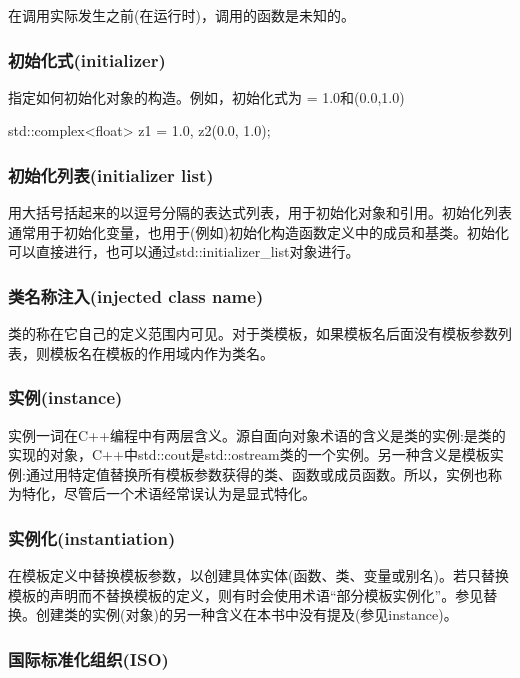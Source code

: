 在调用实际发生之前(在运行时)，调用的函数是未知的。

\subsubsection{初始化式(initializer)}

指定如何初始化对象的构造。例如，初始化式为 = 1.0和(0.0,1.0)
\begin{cpp}
std::complex<float> z1 = 1.0, z2(0.0, 1.0);
\end{cpp}

\subsubsection{初始化列表(initializer list)}

用大括号括起来的以逗号分隔的表达式列表，用于初始化对象和引用。初始化列表通常用于初始化变量，也用于(例如)初始化构造函数定义中的成员和基类。初始化可以直接进行，也可以通过std::initializer\_list对象进行。

\subsubsection{类名称注入(injected class name)}

类的称在它自己的定义范围内可见。对于类模板，如果模板名后面没有模板参数列表，则模板名在模板的作用域内作为类名。

\subsubsection{实例(instance)}

实例一词在C++编程中有两层含义。源自面向对象术语的含义是类的实例:是类的实现的对象，C++中std::cout是std::ostream类的一个实例。另一种含义是模板实例:通过用特定值替换所有模板参数获得的类、函数或成员函数。所以，实例也称为特化，尽管后一个术语经常误认为是显式特化。

\subsubsection{实例化(instantiation)}

在模板定义中替换模板参数，以创建具体实体(函数、类、变量或别名)。若只替换模板的声明而不替换模板的定义，则有时会使用术语“部分模板实例化”。参见替换。创建类的实例(对象)的另一种含义在本书中没有提及(参见instance)。

\subsubsection{国际标准化组织(ISO)}

